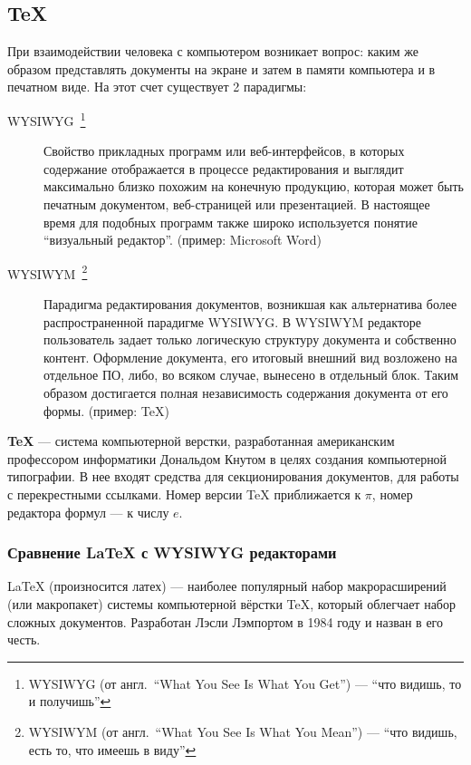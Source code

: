 \subsection{\TeX}\label{subsec:tex}

При взаимодействии человека с компьютером возникает вопрос: каким же образом представлять документы на экране и затем в памяти компьютера и в печатном виде. На этот счет существует 2 парадигмы:

\begin{description}
    \item [WYSIWYG~\footnote{WYSIWYG (от англ.\ \enquote{What You See Is What You Get}) --- \enquote{что видишь, то и получишь}}]
          Свойство прикладных программ или веб-интерфейсов, в которых содержание отображается в процессе редактирования и выглядит максимально близко похожим на конечную продукцию, которая может быть печатным документом, веб-страницей или презентацией. В настоящее время для подобных программ также широко используется понятие \enquote{визуальный редактор}. (пример: Microsoft Word)
    \item [WYSIWYM~\footnote{WYSIWYM (от англ.\ \enquote{What You See Is What You Mean}) --- \enquote{что видишь, есть то, что имеешь в виду}}]
          Парадигма редактирования документов, возникшая как альтернатива более распространенной парадигме WYSIWYG. В WYSIWYM редакторе пользователь задает только логическую структуру документа и собственно контент. Оформление документа, его итоговый внешний вид возложено на отдельное ПО, либо, во всяком случае, вынесено в отдельный блок. Таким образом достигается полная независимость содержания документа от его формы. (пример: \TeX)
\end{description}

\textbf{\TeX} --- система компьютерной верстки, разработанная американским профессором информатики Дональдом Кнутом в целях создания компьютерной типографии. В нее входят средства для секционирования документов, для работы с перекрестными ссылками. Номер версии \TeX{} приближается к $\pi$, номер редактора формул --- к числу $e$.

\subsubsection{Сравнение \LaTeX{} с WYSIWYG редакторами}\label{subsubsec:latex-vs-word}
\LaTeX{} (произносится латех) --- наиболее популярный набор макрорасширений (или макропакет) системы компьютерной вёрстки \TeX, который облегчает набор сложных документов. Разработан Лэсли Лэмпортом в 1984 году и назван в его честь.

